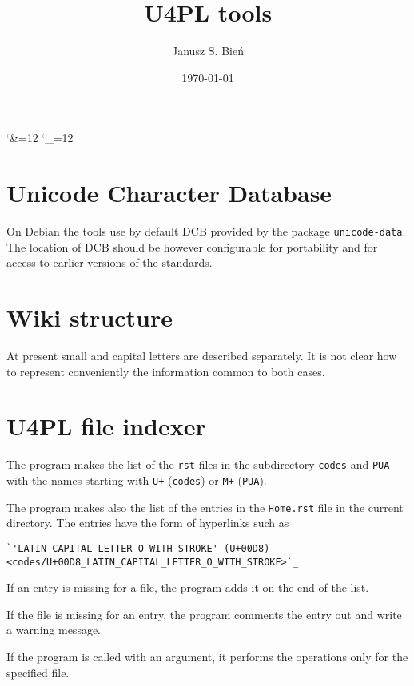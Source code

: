 \documentclass[12]{mwart}
\title{U4PL tools}
\author{Janusz S. Bień}
\date{\today}
\begin{document}
\maketitle

\catcode`\&=12
\catcode`\_=12

\section{Unicode Character Database}
\label{sec:unic-char-datab}

On Debian the tools use by default DCB provided by the package
\texttt{unicode-data}. The location of DCB should be however
configurable for portability and for access to earlier versions of the
standards.

\section{Wiki structure}
\label{sec:wiki-structure}

At present small and capital letters are described separately. It is
not clear how to represent conveniently the information common to both
cases.

\section{U4PL file indexer}
\label{sec:u4pl-file-indexer}

The program makes the list of the \texttt{rst} files in the
subdirectory \texttt{codes} and \texttt{PUA} with the names starting
with \texttt{U+} (\texttt{codes}) or \texttt{M+} (\texttt{PUA}).

The program makes also the list of the entries in the
\texttt{Home.rst} file in the current directory. The entries have the form
of hyperlinks such as

{
\begin{verbatim}
`'LATIN CAPITAL LETTER O WITH STROKE' (U+00D8) <codes/U+00D8_LATIN_CAPITAL_LETTER_O_WITH_STROKE>`_
\end{verbatim}
}

If an entry is missing for a file, the program adds it on the end of the list.

If the file is missing for an entry, the program comments the entry
out and write a warning message.

If the program is called with an argument, it performs the operations
only for the specified file.
\end{document}
